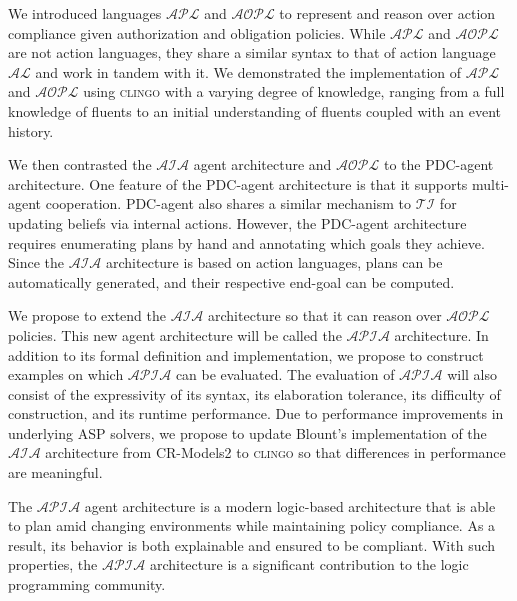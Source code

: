 We introduced languages $\mathcal{APL}$ and $\mathcal{AOPL}$ to represent and reason over action compliance given authorization and obligation policies.
While $\mathcal{APL}$ and $\mathcal{AOPL}$ are not action languages, they share a similar syntax to that of action language $\mathcal{AL}$ and work in tandem with it.
We demonstrated the implementation of $\mathcal{APL}$ and $\mathcal{AOPL}$ using \textsc{clingo} with a varying degree of knowledge, ranging from a full knowledge of fluents to an initial understanding of fluents coupled with an event history.

We then contrasted the $\mathcal{AIA}$ agent architecture and $\mathcal{AOPL}$ to the PDC-agent architecture.
One feature of the PDC-agent architecture is that it supports multi-agent cooperation.
PDC-agent also shares a similar mechanism to $\mathcal{TI}$ for updating beliefs via internal actions.
However, the PDC-agent architecture requires enumerating plans by hand and annotating which goals they achieve.
Since the $\mathcal{AIA}$ architecture is based on action languages, plans can be automatically generated, and their respective end-goal can be computed.

We propose to extend the $\mathcal{AIA}$ architecture so that it can reason over $\mathcal{AOPL}$ policies.
This new agent architecture will be called the $\mathcal{APIA}$ architecture.
In addition to its formal definition and implementation, we propose to construct examples on which $\mathcal{APIA}$ can be evaluated.
The evaluation of $\mathcal{APIA}$ will also consist of the expressivity of its syntax, its elaboration tolerance, its difficulty of construction, and its runtime performance.
Due to performance improvements in underlying ASP solvers, we propose to update Blount's implementation of the $\mathcal{AIA}$ architecture from CR-Models2 to \textsc{clingo} so that differences in performance are meaningful.

The $\mathcal{APIA}$ agent architecture is a modern logic-based architecture that is able to plan amid changing environments while maintaining policy compliance.
As a result, its behavior is both explainable and ensured to be compliant.
With such properties, the $\mathcal{APIA}$ architecture is a significant contribution to the logic programming community.
